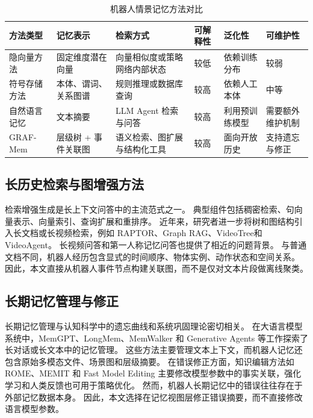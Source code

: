 \documentclass{cjc}
\begin{document}
\begin{table}[t]
  \centering
  \caption{机器人情景记忆方法对比}
  \label{tab:memorycompare}
  \small
  \begin{tabular}{@{}p{2.1cm}p{3.1cm}p{3.0cm}p{1.8cm}p{2.1cm}p{2.0cm}@{}}
    \toprule
    方法类型 & 记忆表示 & 检索方式 & 可解释性 & 泛化性 & 可维护性 \\
    \midrule
    隐向量方法 & 固定维度潜在向量 & 向量相似度或策略网络内部状态 & 较低 & 依赖训练分布 & 较弱 \\
    符号存储方法 & 本体、谓词、关系图谱 & 规则推理或数据库查询 & 较高 & 依赖人工本体 & 中等 \\
    自然语言记忆 & 文本摘要 & LLM Agent 检索与问答 & 较高 & 利用预训练模型 & 需要额外维护机制 \\
    GRAF-Mem & 层级树 + 事件关联图 & 语义检索、图扩展与结构化工具 & 较高 & 面向开放历史 & 支持遗忘与修正 \\
    \bottomrule
  \end{tabular}
\end{table}

\subsection{长历史检索与图增强方法}

检索增强生成是长上下文问答中的主流范式之一\cite{lewis2020rag}。
典型组件包括稠密检索\cite{karpukhin2020dpr}、句向量表示\cite{reimers2019sbert}、向量索引\cite{johnson2019faiss}、查询扩展\cite{gao2023hyde}和重排序\cite{nogueira2019reranking}。
近年来，研究者进一步将树和图结构引入长文档或长视频检索，例如 RAPTOR\cite{sarthi2024raptor}、Graph RAG\cite{edge2024graphrag}、VideoTree\cite{wang2024videotree}和 VideoAgent\cite{wang2024videoagent}。
长视频问答和第一人称记忆问答也提供了相近的问题背景\cite{barmann2022egocentric}。
与普通文档不同，机器人经历包含显式的时间顺序、物体实例、动作状态和空间关系。
因此，本文直接从机器人事件节点构建关联图，而不是仅对文本片段做离线聚类。

\subsection{长期记忆管理与修正}

长期记忆管理与认知科学中的遗忘曲线和系统巩固理论密切相关\cite{ebbinghaus1913memory,winocur2011memory}。
在大语言模型系统中，MemGPT、LongMem、MemWalker 和 Generative Agents 等工作探索了长对话或长文本中的记忆管理\cite{packer2023memgpt,wang2023longmem,chen2023memwalker,park2023generative}。
这些方法主要管理文本上下文，而机器人记忆还包含原始多模态文件、场景图和层级摘要。
在错误修正方面，知识编辑方法如 ROME、MEMIT 和 Fast Model Editing 主要修改模型参数中的事实关联\cite{meng2022rome,meng2023memit,mitchell2022fast,mitchell2022memory}，强化学习和人类反馈也可用于策略优化\cite{christiano2017rlhf}。
然而，机器人长期记忆中的错误往往存在于外部记忆数据本身。
因此，本文选择在记忆视图层修正错误摘要，而不直接修改语言模型参数。
\end{document}
